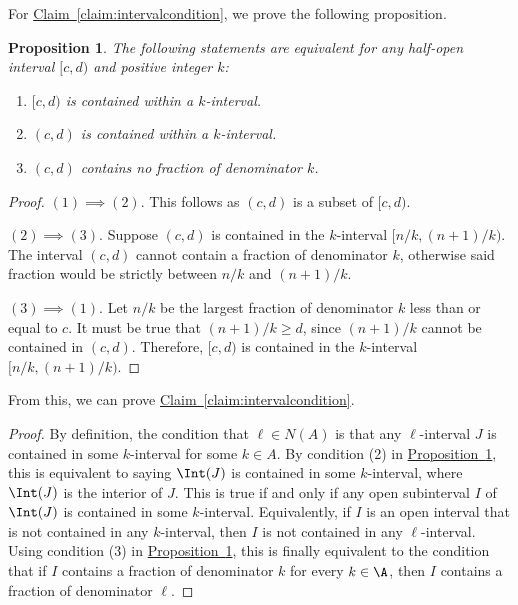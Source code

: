 \documentclass[11pt]{article}
\numberwithin{equation}{section}
\newtheorem{proposition}[theorem]{Proposition}
\theoremstyle{definition}
\theoremstyle{plain}
\newcommand{\expref}[2]{\hyperref[#2]{#1~\ref{#2}}}
\begin{document}
For \expref{Claim}{claim:intervalcondition},  we prove the following proposition.
\begin{proposition}
    \label{prop:intervalcondition-1}
    The following statements are equivalent for any half-open interval $[c,d)$ and positive integer $k$:
    \begin{enumerate}[(1)]
        \item $[c,d)$ is contained within a $k$-interval.
        \item $(c,d)$ is contained within a $k$-interval.
        \item $(c,d)$ contains no fraction of denominator $k$.
    \end{enumerate}
\end{proposition}

\begin{proof} $(1) \implies (2)$. This follows as $(c,d)$ is a subset of $[c,d)$.
        
        $(2) \implies (3)$. Suppose $(c,d)$ is contained in the $k$-interval $[n/k, (n+1)/k)$. The interval $(c,d)$ cannot contain a fraction of denominator $k$, otherwise said fraction would be strictly between $n/k$ and $(n+1)/k$.
        
        $(3) \implies (1)$. Let $n/k$ be the largest fraction of denominator $k$ less than or equal to $c$. It must be true that $(n+1)/k\ge d$, since $(n+1)/k$ cannot be contained in $(c,d)$. Therefore, $[c,d)$ is contained in the $k$-interval $[n/k, (n+1)/k)$.
\end{proof}

From this, we can prove \expref{Claim}{claim:intervalcondition}. 

\begin{proof}
    By definition, the condition that $\ell\in N(A)$ is that any $\ell$-interval $J$ is contained in some $k$-interval for some $k\in A$. By condition (2) in \expref{Proposition}{prop:intervalcondition-1}, this is equivalent to saying $\Int(J)$ is contained in some $k$-interval, where $\Int(J)$ is the interior of $J$. This is true if and only if any open subinterval $I$ of $\Int(J)$ is contained in some $k$-interval. Equivalently, if $I$ is an open interval that is not contained in any $k$-interval, then $I$ is not contained in any $\ell$-interval. Using condition (3) in \expref{Proposition}{prop:intervalcondition-1}, this is finally equivalent to the condition that if $I$ contains a fraction of denominator $k$ for every $k\in \A$, then $I$ contains a fraction of denominator $\ell$.
\end{proof}
\end{document}
